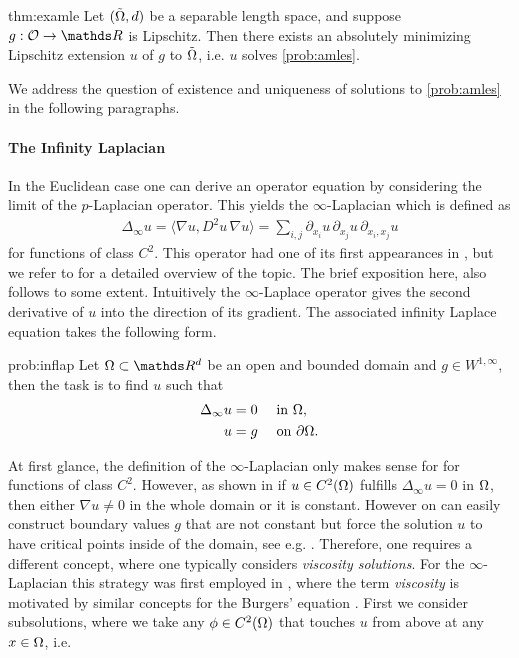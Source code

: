 \begin{theorem}{\cite[Th. 4.3]{juutinen2002absolutely}}{thm:examle}
Let $(\tilde{\Omega}, d)$ be a separable length space, and suppose $g: \conset\to\R$ is Lipschitz. Then there exists an absolutely minimizing Lipschitz extension $u$ of $g$ to $\tilde{\Omega}$, i.e. $u$ solves \cref{prob:amles}.
\end{theorem}
%
\noindent%
We address the question of existence and uniqueness of solutions to \cref{prob:amles} in the following paragraphs.
%
%
\paragraph{The Infinity Laplacian} In the Euclidean case one can derive an operator equation by considering the limit of the $p$-Laplacian operator. This yields the $\infty$-Laplacian which is defined as
%
\begin{align*}
\Delta_\infty u = \langle \nabla u, D^2 u\, \nabla u\rangle = 
\sum_{i,j} \partial_{x_i} u\, \partial_{x_j} u\, \partial_{x_i,x_j} u
\end{align*}
%
for functions of class $C^2$. This operator had one of its first appearances in \cite{aronsson1968partial}, but we refer to \cite{lindqvist2017notes} for a detailed overview of the topic. The brief exposition here, also follows \cite{lindqvist2017notes} to some extent. Intuitively the $\infty$-Laplace operator gives the second derivative of $u$ into the direction of its gradient. The associated infinity Laplace equation takes the following form.
%
\begin{problem}{}{prob:inflap}
Let $\domain\subset\R^d$ be an open and bounded domain and $g\in W^{1,\infty}$, then the task is to find $u$ such that
%
\begin{align*}
\Delta_\infty u &= 0\quad\text{ in }\Omega,\\
u &= g\quad \text{ on }\partial\Omega.
\end{align*}
\end{problem}
%
\noindent%
At first glance, the definition of the $\infty$-Laplacian only makes sense for for functions of class $C^2$. However, as shown in \cite{yu2006remark, aronsson1968partial} if $u\in C^2(\Omega)$ fulfills $\Delta_\infty u = 0$ in $\Omega$, then either $\nabla u \neq 0$ in the whole domain or it is constant. However on can easily construct boundary values $g$ that are not constant but force the solution $u$ to have critical points inside of the domain, see e.g. \cite{lindqvist2016notes}. Therefore, one requires a different concept, where one typically considers \emph{viscosity solutions}. For the $\infty$-Laplacian this strategy was first employed in \cite{bhattacharya1989limits}, where the term \emph{viscosity} is motivated by similar concepts for the Burgers' equation \cite{burgers1948mathematical}. First we consider subsolutions, where we take any $\phi\in C^2(\Omega)$ that touches $u$ from above at any $x\in\Omega$, i.e.
